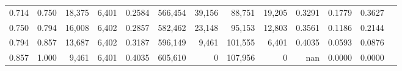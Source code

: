 \begin{tabular}{rrrrrrrrrrrrr}
0.714 & 0.750 & 18,375 & 6,401 &                                     0.2584 & 566,454 &  39,156 &  88,751 &  19,205 & 0.3291 & 0.1779 & 0.3627 \\
0.750 & 0.794 & 16,008 & 6,402 &                                     0.2857 & 582,462 &  23,148 &  95,153 &  12,803 & 0.3561 & 0.1186 & 0.2144 \\
0.794 & 0.857 & 13,687 & 6,402 &                                     0.3187 & 596,149 &   9,461 & 101,555 &   6,401 & 0.4035 & 0.0593 & 0.0876 \\
0.857 & 1.000 &  9,461 & 6,401 &                                     0.4035 & 605,610 &       0 & 107,956 &       0 &    nan & 0.0000 & 0.0000 \\
\bottomrule
\end{tabular}
